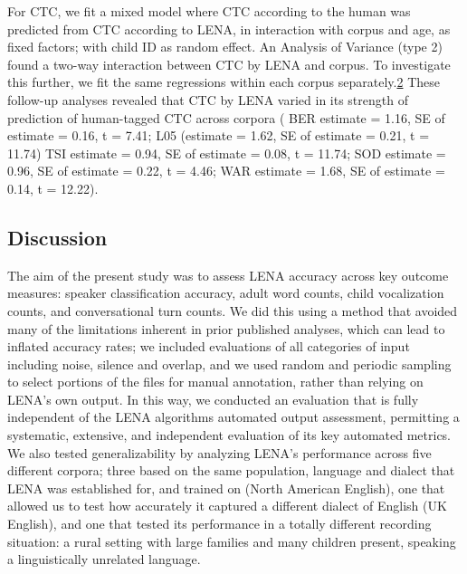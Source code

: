 \documentclass[english,floatsintext,man]{apa6}
\begin{document}
For CTC, we fit a mixed model where CTC according to the human was
predicted from CTC according to LENA, in interaction with corpus and
age, as fixed factors; with child ID as random effect. An Analysis of
Variance (type 2) found a two-way interaction between CTC by LENA and
corpus. To investigate this further, we fit the same regressions within
each corpus
separately.\href{For\%20both\%20TSI\%20and\%20WAR,\%20the\%20variance\%20associated\%20to\%20the\%20child\%20ID\%20random\%20factor\%20was\%20zero.\%20This\%20suggests\%20a\%20mixed\%20model\%20was\%20not\%20necessary,\%20as\%20child\%20ID\%20is\%20not\%20explaining\%20any\%20additional\%20variance,\%20but\%20it\%20does\%20not\%20alter\%20the\%20interpretation\%20in\%20the\%20main\%20text.}{2}
These follow-up analyses revealed that CTC by LENA varied in its
strength of prediction of human-tagged CTC across corpora ( BER estimate
= 1.16, SE of estimate = 0.16, t = 7.41; L05 (estimate = 1.62, SE of
estimate = 0.21, t = 11.74) TSI estimate = 0.94, SE of estimate = 0.08,
t = 11.74; SOD estimate = 0.96, SE of estimate = 0.22, t = 4.46; WAR
estimate = 1.68, SE of estimate = 0.14, t = 12.22).

\subsection{Discussion}\label{discussion}

The aim of the present study was to assess LENA accuracy across key
outcome measures: speaker classification accuracy, adult word counts,
child vocalization counts, and conversational turn counts. We did this
using a method that avoided many of the limitations inherent in prior
published analyses, which can lead to inflated accuracy rates; we
included evaluations of all categories of input including noise, silence
and overlap, and we used random and periodic sampling to select portions
of the files for manual annotation, rather than relying on LENA's own
output. In this way, we conducted an evaluation that is fully
independent of the LENA algorithms automated output assessment,
permitting a systematic, extensive, and independent evaluation of its
key automated metrics. We also tested generalizability by analyzing
LENA's performance across five different corpora; three based on the
same population, language and dialect that LENA was established for, and
trained on (North American English), one that allowed us to test how
accurately it captured a different dialect of English (UK English), and
one that tested its performance in a totally different recording
situation: a rural setting with large families and many children
present, speaking a linguistically unrelated language.
\end{document}
